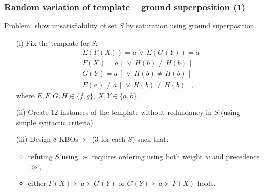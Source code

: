 \documentclass[xcolor={table}]{beamer}
\begin{document}
\begin{frame}
  \frametitle{Random variation of template -- ground superposition (1)}

  Problem: show unsatisfiability of set $S$ by saturation using ground superposition.\\
  \vspace*{0.5em}
  \pause

  \begin{itemize}[<+->]
\item[(i)] Fix the template for $S$:
{\small
\begin{align}
  &E(F(X)) = a \,\lor\, E(G(Y)) = a \label{gs:1} \\
  &F(X) = a \,[\, \lor\, H(b) \not= H(b) \,] \label{gs:2} \\
  &G(Y) = a \,[\, \lor\, H(b) \not= H(b) \,] \label{gs:3} \\
  &E(a) \not= a \,[\, \lor\, H(b) \not= H(b) \,] \label{gs:4},
\end{align}
}
where $E, F, G, H \in \{f, g\}$, $X, Y \in \{a, b\}$.
\item[(ii)] Create 12 instances of the template without redundancy in $S$
  (using simple syntactic criteria).
\item[(iii)] Design 8 KBOs $\succ$ (3 for each $S$) such that:
  \begin{itemize}
    \item refuting $S$ using $\succ$ requires ordering using both weight $w$ and precedence $\gg$,
    \item either $F(X) \succ a \succ G(Y)$ or $G(Y) \succ a \succ F(X)$ holds.
  \end{itemize}
\end{itemize}

\end{frame}
\end{document}

